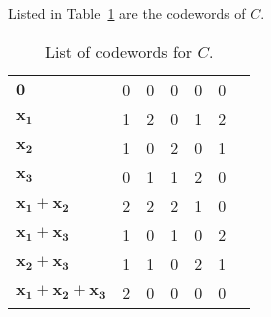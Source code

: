 Listed in Table~\ref{tab:7} are the codewords of $C$.
\begin{table}[!htp]\centering
\begin{tabular}{l|rrrrrr}\toprule
$\bm{0}$ &0 &0 &0 &0 &0 \\
$\bm{x_1}$ &1 &2 &0 &1 &2 \\
$\bm{x_2}$ &1 &0 &2 &0 &1 \\
$\bm{x_3}$ &0 &1 &1 &2 &0 \\
$\bm{x_1+x_2}$ &2 &2 &2 &1 &0 \\
$\bm{x_1+x_3}$ &1 &0 &1 &0 &2 \\
$\bm{x_2+x_3}$ &1 &1 &0 &2 &1 \\
$\bm{x_1+x_2+x_3}$ &2 &0 &0 &0 &0 \\
\bottomrule
\end{tabular}
\caption{List of codewords for $C$.}\label{tab:7}
\end{table}%
